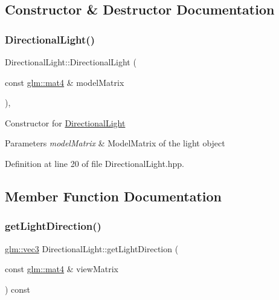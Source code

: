\subsection{Constructor \& Destructor Documentation}
\mbox{\label{class_directional_light_ac57db47063c4b8174758ef8d305351c0}} 
\subsubsection{\texorpdfstring{Directional\+Light()}{DirectionalLight()}}
{\footnotesize\ttfamily Directional\+Light\+::\+Directional\+Light (\begin{DoxyParamCaption}\item[{const \hyperlink{group__core__types_ga7dcd2365c2e368e6af5b7adeb6a9c8df}{glm\+::mat4} \&}]{model\+Matrix }\end{DoxyParamCaption})\hspace{0.3cm}{\ttfamily [inline]}, {\ttfamily [explicit]}}

Constructor for \hyperlink{class_directional_light}{Directional\+Light} 
\begin{DoxyParams}{Parameters}
{\em model\+Matrix} & Model\+Matrix of the light object \\
\hline
\end{DoxyParams}


Definition at line 20 of file Directional\+Light.\+hpp.



\subsection{Member Function Documentation}
\mbox{\label{class_directional_light_a5e535357b3efa03980be8118b88ad031}} 
\subsubsection{\texorpdfstring{get\+Light\+Direction()}{getLightDirection()}}
{\footnotesize\ttfamily \hyperlink{group__core__types_ga1c47e8b3386109bc992b6c48e91b0be7}{glm\+::vec3} Directional\+Light\+::get\+Light\+Direction (\begin{DoxyParamCaption}\item[{const \hyperlink{group__core__types_ga7dcd2365c2e368e6af5b7adeb6a9c8df}{glm\+::mat4} \&}]{view\+Matrix }\end{DoxyParamCaption}) const\hspace{0.3cm}{\ttfamily [inline]}}

